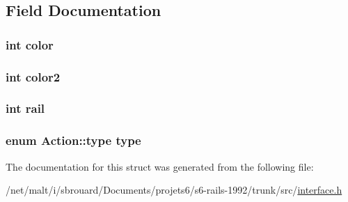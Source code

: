 \subsection{Field Documentation}
\hypertarget{structAction_a0fd02fb9277ffcb35a75066ffe95e8c7}{
\subsubsection[{color}]{\setlength{\rightskip}{0pt plus 5cm}int color}}\label{structAction_a0fd02fb9277ffcb35a75066ffe95e8c7}
\hypertarget{structAction_af2bf5a425a34388039e1cdfd13630ac5}{
\subsubsection[{color2}]{\setlength{\rightskip}{0pt plus 5cm}int color2}}\label{structAction_af2bf5a425a34388039e1cdfd13630ac5}
\hypertarget{structAction_a1017757e6fb62c1e1415b8663a5fc128}{
\subsubsection[{rail}]{\setlength{\rightskip}{0pt plus 5cm}int rail}}\label{structAction_a1017757e6fb62c1e1415b8663a5fc128}
\hypertarget{structAction_ac4770bb96de67bcd126a908b894aed3e}{
\subsubsection[{type}]{\setlength{\rightskip}{0pt plus 5cm}enum {\bf Action\-::type}  {\bf type}}}\label{structAction_ac4770bb96de67bcd126a908b894aed3e}


The documentation for this struct was generated from the following file\-:\begin{DoxyCompactItemize}
\item 
/net/malt/i/sbrouard/\-Documents/projets6/s6-\/rails-\/1992/trunk/src/\hyperlink{interface_8h}{interface.\-h}\end{DoxyCompactItemize}

